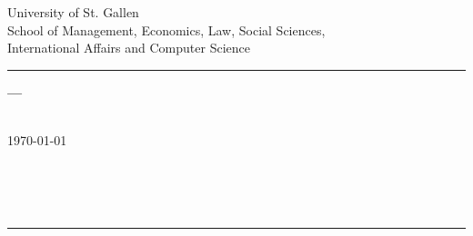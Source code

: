 \begin{center}
\Large{
University of St. Gallen\\
School of Management, Economics, Law, Social Sciences,\\International Affairs and Computer Science
}
\vspace{.9cm}
\hrule
\vspace{2.8cm}
\Huge{\textsf{\textbf{
\theTitle
}}}
\vspace{.5cm}

\Large{\textsf{\textbf{---\\ \theSubtitle}}}\\
\vspace{2.8cm}

\Large{\today}\\
\vspace{.9cm}

\Large{
\theAuthor\\
\theAddress\\
\theZip~\theCity\\
\theMatriculation}
\vspace{2.8cm}
\hrule
\vspace{.9cm}
\Large{\theType\\
\theSupervisor\\
\theSemester}
\end{center}
\thispagestyle{empty}